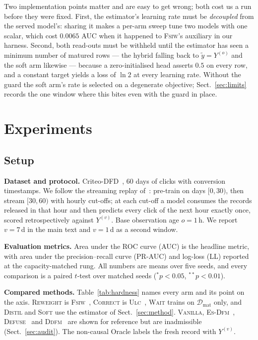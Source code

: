 \documentclass[runningheads]{llncs}
\newcommand{\Yo}{Y^{(o)}}
\newcommand{\Yv}{Y^{(v)}}
\begin{document}
Two implementation points matter and are easy to get wrong; both cost us a run before they were
fixed. First, the estimator's learning rate must be \emph{decoupled} from the served model's:
sharing it makes a per-arm sweep tune two models with one scalar, which cost $0.0065$ AUC when it
happened to \textsc{Fsiw}'s auxiliary in our harness. Second, both read-outs must be withheld until
the estimator has seen a minimum number of matured rows --- the hybrid falling back to
$\tilde y = \Yo$ and the soft arm likewise --- because a zero-initialised head asserts $0.5$ on
every row, and a constant target yields a loss of $\ln 2$ at every learning rate. Without the guard
the soft arm's rate is selected on a degenerate objective; Sect.~\ref{sec:limits} records the one
window where this bites even with the guard in place.

\section{Experiments}\label{sec:experiments}

\subsection{Setup}\label{sec:setup}

\noindent\textbf{Dataset and protocol.} Criteo-DFD~\cite{chapelle2014modeling}, 60 days of clicks
with conversion timestamps. We follow the streaming replay of~\cite{li2026twice}: pre-train on days
$[0,30)$, then stream $[30,60)$ with hourly cut-offs; at each cut-off a model consumes the records
released in that hour and then predicts every click of the next hour exactly once, scored
retrospectively against $\Yv$. Base observation age $o = 1$\,h. We report $v = 7$\,d in the main
text and $v = 1$\,d as a second window.

\noindent\textbf{Evaluation metrics.} Area under the ROC curve (AUC) is the headline metric, with
area under the precision--recall curve (PR-AUC) and log-loss (LL) reported at the capacity-matched
rung. All numbers are means over five seeds, and every comparison is a paired $t$-test over matched
seeds ($^{\ast}p<0.05$, $^{\ast\ast}p<0.01$).

\noindent\textbf{Compared methods.} Table~\ref{tab:hardness} names every arm and its point on the
axis. \textsc{Reweight} is \textsc{Fsiw}~\cite{yasui2020feedback}, \textsc{Correct} is
\textsc{Ulc}~\cite{wang2023unbiased}, \textsc{Wait} trains on $\mathcal{D}_{\text{mat}}$ only, and
\textsc{Distil} and \textsc{Soft} use the estimator of Sect.~\ref{sec:method}. \textsc{Vanilla},
\textsc{Es-Dfm}~\cite{yang2021capturing}, \textsc{Defuse}~\cite{chen2022asymptotically} and
\textsc{Ddfm}~\cite{dai2023dually} are shown for reference but are inadmissible
(Sect.~\ref{sec:audit}). The non-causal Oracle labels the fresh record with $\Yv$.
\end{document}
